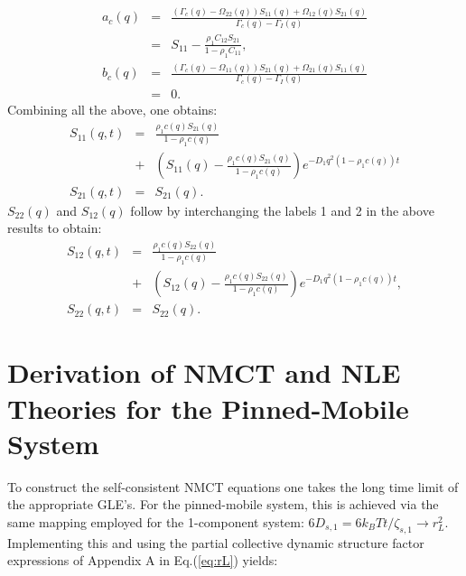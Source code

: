 \documentclass[twocolumn,showpacs,preprintnumbers,amsmath,amssymb,unsortedaddress,
]{revtex4-1}
\begin{document}
\begin{eqnarray}
a_c(q) &=& \frac{(\Gamma_c(q)-\Omega_{22}(q))S_{11}(q) + \Omega_{12}(q)S_{21}(q)}{\Gamma_c(q)-\Gamma_I(q)}\nonumber\\
 &=& S_{11}-\frac{\rho_1C_{12}S_{21}}{1-\rho_1C_{11}},\nonumber\\
b_c(q) &=& \frac{(\Gamma_c(q)-\Omega_{11}(q))S_{21}(q) + \Omega_{21}(q)S_{11}(q)}{\Gamma_c(q)-\Gamma_I(q)}\nonumber\\ &=& 0.
\end{eqnarray}
Combining all the above, one obtains:
\begin{eqnarray}
S_{11}(q,t) &=&  \frac{\rho_1c(q)S_{21}(q)}{1-\rho_1c(q)} \nonumber\\
&+& \left(S_{11}(q)-\frac{\rho_1c(q)S_{21}(q)}{1-\rho_1c(q)} \right)e^{-D_1q^2(1-\rho_1c(q))t} \nonumber\\
S_{21}(q,t) &=& S_{21}(q).
\label{eq:S113}
\end{eqnarray}
$S_{22}(q)$ and $S_{12}(q)$ follow by interchanging the labels 1 and 2 in the above results to obtain:
\begin{eqnarray}
S_{12}(q,t) &=&  \frac{\rho_1c(q)S_{22}(q)}{1-\rho_1c(q)} \nonumber\\
&+&\left(S_{12}(q) -\frac{\rho_1c(q)S_{22}(q)}{1-\rho_1c(q)}\right)e^{-D_1q^2(1-\rho_1c(q))t}, \nonumber\\
S_{22}(q,t) &=& S_{22}(q). 
\end{eqnarray}

\section{Derivation of NMCT and NLE Theories for the Pinned-Mobile System}
To construct the self-consistent NMCT equations one takes the long time limit of the appropriate GLE’s. For the pinned-mobile system, this is achieved via the same mapping employed for the 1-component system: $6D_{s,1}=6k_BTt/\zeta_{s,1}\rightarrow r_L^2$. Implementing this and using the partial collective dynamic structure factor expressions of Appendix A in Eq.(\ref{eq:rL}) yields:
\end{document}
